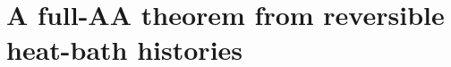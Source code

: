 \section{A full-AA theorem from reversible heat-bath histories}
\label{sec:resolution-dynamics}







